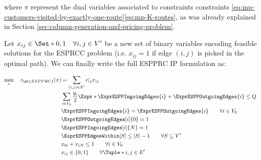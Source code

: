 where $\pi$ represent the dual variables associated to constraints constraints \eqref{eq:mp-customers-visited-by-exactly-one-route}\eqref{eq:mp-K-routes},
as was already explained in Section \ref{sec:column-generation-and-pricing-problem}.

Let $x_{ij} \in \Set*{0, 1} \quad \forall i, j \in V^\prime$ be a new set of binary variables
encoding feasible solutions for the ESPRCC problem (i.e. $x_{ij} = 1$ if edge $(i, j)$ is picked in the optimal path).
We can finally write the full ESPPRC IP formulation as:

\begin{align}
	\min_{x} \quad z_\mt{ESPPRC}(x) & =  \sum_{(i, j) \in E^\prime} \bar{c_{ij}} x_{ij} \label{eq:espprc-obj-function}                                                                                                               \\
	                                & \sum_{i \in V_0} \frac{q_i}{2} \Expr*{ \ExprESPPIngoingEdges{i} + \ExprESPPOutgoingEdges{i} }  \le Q                            \label{eq:espprc-resource-upper-bound-constraint}              \\
	                                & \ExprESPPIngoingEdges{i} = \ExprESPPOutgoingEdges{i}                                                \qquad \forall i \in V_0          \label{eq:espprc-flow-conservation-constraint-customers} \\
	                                & \ExprESPPOutgoingEdges[i]{0} = 1                                                                                                      \label{eq:espprc-flow-conservation-constraint-depot1}    \\
	                                & \ExprESPPIngoingEdges[i]{N} = 1                                                                                                       \label{eq:espprc-flow-conservation-constraint-depot2}    \\
	                                & \ExprESPPEdgesWithin[S] \le |S| - 1                                                                  \qquad \forall S \subseteq V^\prime   \label{eq:espprc-sec-constraints}                   \\
	                                & x_{0i} + x_{iN} \le 1                                                                                \qquad \forall i \in V_0         \label{eq:espprc-binding-directed}                       \\
	                                & x_{ij}                   \in \lbrace 0, 1 \rbrace                                                    \qquad \forall \Tuple*{i, j} \in E^\prime    \label{eq:espprc-x-mip-var-bounds}           \\
\end{align}

